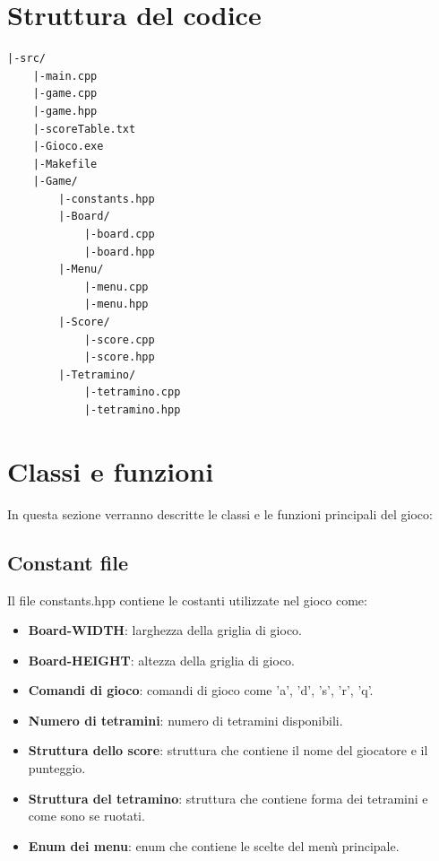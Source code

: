 \documentclass{article}
\begin{document}
\section{Struttura del codice}
\begin{verbatim}
|-src/ 
    |-main.cpp
    |-game.cpp
    |-game.hpp
    |-scoreTable.txt 
    |-Gioco.exe 
    |-Makefile
    |-Game/
        |-constants.hpp
        |-Board/
            |-board.cpp
            |-board.hpp
        |-Menu/
            |-menu.cpp
            |-menu.hpp  
        |-Score/
            |-score.cpp
            |-score.hpp
        |-Tetramino/
            |-tetramino.cpp
            |-tetramino.hpp
\end{verbatim}

\section{Classi e funzioni}
In questa sezione verranno descritte le classi e le funzioni principali del gioco:

\subsection{Constant file}
Il file constants.hpp contiene le costanti utilizzate nel gioco come:
\begin{itemize}
\item \textbf{Board-WIDTH}: larghezza della griglia di gioco.
\item \textbf{Board-HEIGHT}: altezza della griglia di gioco.
\item \textbf{Comandi di gioco}: comandi di gioco come 'a', 'd', 's', 'r', 'q'.
\item \textbf{Numero di tetramini}: numero di tetramini disponibili.
\item \textbf{Struttura dello score}: struttura che contiene il nome del giocatore e il punteggio.
\item \textbf{Struttura del tetramino}: struttura che contiene forma dei tetramini e come sono se ruotati.
\item  \textbf{Enum dei menu}: enum che contiene le scelte del menù principale. 
\end{itemize}
\end{document}
